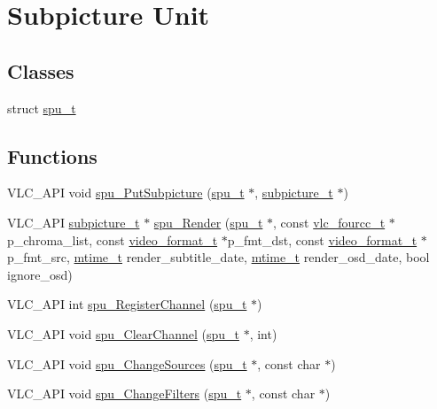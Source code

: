 \hypertarget{group__spu}{}\section{Subpicture Unit}
\label{group__spu}
\subsection*{Classes}
\begin{DoxyCompactItemize}
\item 
struct \hyperlink{structspu__t}{spu\+\_\+t}
\end{DoxyCompactItemize}
\subsection*{Functions}
\begin{DoxyCompactItemize}
\item 
V\+L\+C\+\_\+\+A\+PI void \hyperlink{group__spu_gad59fdd18b195cf3f1009ae648462570a}{spu\+\_\+\+Put\+Subpicture} (\hyperlink{structspu__t}{spu\+\_\+t} $\ast$, \hyperlink{structsubpicture__t}{subpicture\+\_\+t} $\ast$)
\item 
V\+L\+C\+\_\+\+A\+PI \hyperlink{structsubpicture__t}{subpicture\+\_\+t} $\ast$ \hyperlink{group__spu_gad38e4d1f1ab12232d521a670b450fb90}{spu\+\_\+\+Render} (\hyperlink{structspu__t}{spu\+\_\+t} $\ast$, const \hyperlink{vlc__common_8h_af49f89d0f752bc9cff142e43b1bd634d}{vlc\+\_\+fourcc\+\_\+t} $\ast$p\+\_\+chroma\+\_\+list, const \hyperlink{structvideo__format__t}{video\+\_\+format\+\_\+t} $\ast$p\+\_\+fmt\+\_\+dst, const \hyperlink{structvideo__format__t}{video\+\_\+format\+\_\+t} $\ast$p\+\_\+fmt\+\_\+src, \hyperlink{vlc__common_8h_a996e47c5ea061215703c26738351279e}{mtime\+\_\+t} render\+\_\+subtitle\+\_\+date, \hyperlink{vlc__common_8h_a996e47c5ea061215703c26738351279e}{mtime\+\_\+t} render\+\_\+osd\+\_\+date, bool ignore\+\_\+osd)
\item 
V\+L\+C\+\_\+\+A\+PI int \hyperlink{group__spu_gaf4b3f9a5ac28cd9ead38e2f9fd9aeff0}{spu\+\_\+\+Register\+Channel} (\hyperlink{structspu__t}{spu\+\_\+t} $\ast$)
\item 
V\+L\+C\+\_\+\+A\+PI void \hyperlink{group__spu_ga01ff3c370e1b70cb0f0d560a59334e37}{spu\+\_\+\+Clear\+Channel} (\hyperlink{structspu__t}{spu\+\_\+t} $\ast$, int)
\item 
V\+L\+C\+\_\+\+A\+PI void \hyperlink{group__spu_ga231064c2e066598ebcab3f97486c98f7}{spu\+\_\+\+Change\+Sources} (\hyperlink{structspu__t}{spu\+\_\+t} $\ast$, const char $\ast$)
\item 
V\+L\+C\+\_\+\+A\+PI void \hyperlink{group__spu_gae8503a836229a6afba988668e9cbbcff}{spu\+\_\+\+Change\+Filters} (\hyperlink{structspu__t}{spu\+\_\+t} $\ast$, const char $\ast$)
\end{DoxyCompactItemize}


